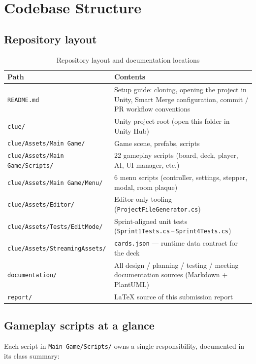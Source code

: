 \section{Codebase Structure}

\subsection*{Repository layout}

\begin{table}[H]
\centering
\begin{tabular}{|p{6.2cm}|p{8cm}|}
\hline
\textbf{Path} & \textbf{Contents} \\ \hline
\texttt{README.md} & Setup guide: cloning, opening the project in Unity, Smart
Merge configuration, commit / PR workflow conventions \\ \hline
\texttt{clue/} & Unity project root (open this folder in Unity Hub) \\ \hline
\texttt{clue/Assets/Main Game/} & Game scene, prefabs, scripts \\ \hline
\texttt{clue/Assets/Main Game/Scripts/} & 22 gameplay scripts (board,
deck, player, AI, UI manager, etc.) \\ \hline
\texttt{clue/Assets/Main Game/Menu/} & 6 menu scripts (controller,
settings, stepper, modal, room plaque) \\ \hline
\texttt{clue/Assets/Editor/} & Editor-only tooling
(\texttt{ProjectFileGenerator.cs}) \\ \hline
\texttt{clue/Assets/Tests/EditMode/} & Sprint-aligned unit tests
(\texttt{Sprint1Tests.cs}\,--\,\texttt{Sprint4Tests.cs}) \\ \hline
\texttt{clue/Assets/StreamingAssets/} & \texttt{cards.json} --- runtime
data contract for the deck \\ \hline
\texttt{documentation/} & All design / planning / testing / meeting documentation
sources (Markdown + PlantUML) \\ \hline
\texttt{report/} & LaTeX source of this submission report \\ \hline
\end{tabular}
\caption{Repository layout and documentation locations}
\end{table}

\subsection*{Gameplay scripts at a glance}

Each script in \texttt{Main Game/Scripts/} owns a single responsibility,
documented in its class summary:

